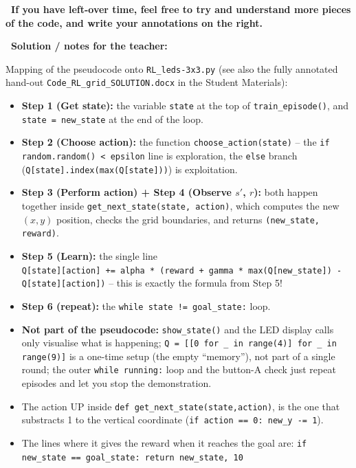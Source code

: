 \documentclass[12pt]{article}
\newenvironment{solution}{%
  \begin{solutionbox}\textbf{\faChalkboardTeacher\ Solution / notes for the teacher:}
}{%
  \end{solutionbox}
}
\begin{document}
\textcolor{maincolor}{\textbf{\faPen\ If you have left-over time, feel free to try and understand more pieces of the code, and write your annotations on the right.}}


\begin{solution}
Mapping of the pseudocode onto \texttt{RL\_leds-3x3.py} (see also the fully annotated hand-out \texttt{Code\_RL\_grid\_SOLUTION.docx} in the Student Materials):
\begin{itemize}
  \item \textbf{Step 1 (Get state):} the variable \texttt{state} at the top of \texttt{train\_episode()}, and \texttt{state = new\_state} at the end of the loop.
  \item \textbf{Step 2 (Choose action):} the function \texttt{choose\_action(state)} -- the \texttt{if random.random() < epsilon} line is exploration, the \texttt{else} branch (\texttt{Q[state].index(max(Q[state]))}) is exploitation.
  \item \textbf{Step 3 (Perform action) + Step 4 (Observe $s'$, $r$):} both happen together inside \texttt{get\_next\_state(state, action)}, which computes the new $(x,y)$ position, checks the grid boundaries, and returns \texttt{(new\_state, reward)}. 
  \item \textbf{Step 5 (Learn):} the single line \\ \texttt{Q[state][action] += alpha * (reward + gamma * max(Q[new\_state]) - Q[state][action])} -- this is exactly the formula from Step 5!
  \item \textbf{Step 6 (repeat):} the \texttt{while state != goal\_state:} loop.
  \item \textbf{Not part of the pseudocode:} \texttt{show\_state()} and the LED display calls only visualise what is happening; \texttt{Q = [[0 for \_ in range(4)] for \_ in range(9)]} is a one-time setup (the empty ``memory''), not part of a single round; the outer \texttt{while running:} loop and the button-A check just repeat episodes and let you stop the demonstration.
  \item The action UP inside \texttt{def get\_next\_state(state,action)}, is the one that substracts 1 to the vertical coordinate (\texttt{if action == 0:    new\_y -= 1}).
  \item The lines where it gives the reward when it reaches the goal are: \texttt{if new\_state == goal\_state:
        return new\_state, 10}
\end{itemize}
\end{solution}
\end{document}
